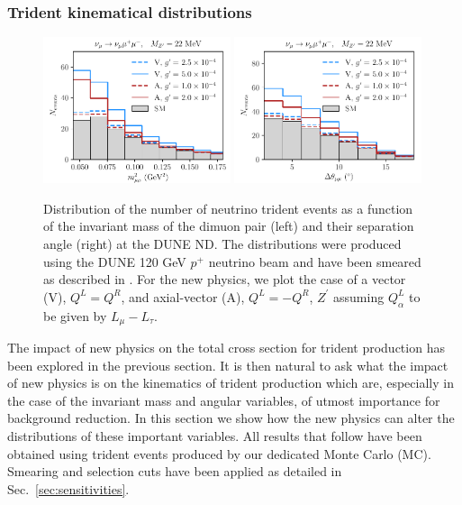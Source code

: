 \subsubsection{Trident kinematical distributions \label{sec:trident_kinematics}}
%
\begin{figure}[t]
%
\centering
%
\includegraphics[width=0.49\textwidth]{BSM_invmass_mumu.pdf}
\includegraphics[width=0.49\textwidth]{BSM_sepangle_mumu.pdf}
%
\caption[Dimuon distributions in the presence of a $Z^\prime$.]{
Distribution of the number of neutrino trident events as a function of the invariant mass of the dimuon pair (left) and their separation angle (right) at the DUNE ND. The distributions were produced using the DUNE 120 GeV $p^+$ neutrino beam and have been smeared as described in . For the new physics, we plot the case of a vector (V), $Q^L = Q^R$, and axial-vector (A), $Q^L = -Q^R$,  $Z^\prime$ assuming $Q^L_{\alpha}$ to be given by $L_\mu - L_\tau$. \label{fig:mm_spectra}}
\end{figure}
%
The impact of new physics on the total cross section for trident production has been explored in the previous section. It is then natural to ask what the impact of new physics is on the kinematics of trident production which are, especially in the case of the invariant mass and angular variables, of utmost importance for background reduction. In this section we show how the new physics can alter the distributions of these important variables. All results that follow have been obtained using trident events produced by our dedicated Monte Carlo (MC). Smearing and selection cuts have been applied as detailed in Sec.~\ref{sec:sensitivities}.

